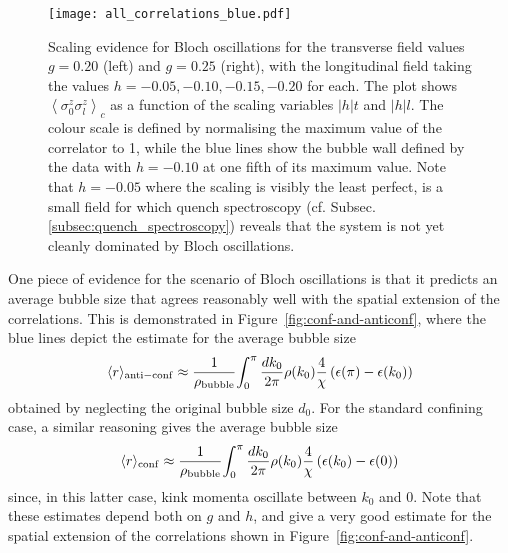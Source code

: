 \documentclass[amsmath,amssymb,11pt]{article}
\numberwithin{equation}{section}
\numberwithin{figure}{section}
\numberwithin{table}{section}
\begin{document}
\begin{figure}
\centering
\texttt{[image: all\_correlations\_blue.pdf]}
\caption{\label{fig:Scaling-evidence-for} Scaling evidence for Bloch oscillations
for the transverse field values $g=0.20$ (left) and $g=0.25$ (right),
with the longitudinal field taking the values $h=-0.05,-0.10,-0.15,-0.20$
for each. The plot shows $\left\langle \sigma_{0}^{z}\sigma_{l}^{z}\right\rangle _{c}$
as a function of the scaling variables $|h|t$ and $|h|l$. The colour scale is defined by normalising the maximum value of the correlator to 1, while the blue lines show the bubble wall defined by the data with $h=-0.10$ at one fifth of its maximum value. {Note that $h=-0.05$ where the scaling is visibly the least perfect, is a small field for which quench spectroscopy (cf. Subsec. \ref{subsec:quench_spectroscopy}) reveals that the system is not yet cleanly dominated by Bloch oscillations.}}
\end{figure}

One piece of evidence for the scenario of Bloch oscillations is that it predicts an average bubble size that agrees reasonably well with the spatial extension of the correlations. This is demonstrated in Figure~\ref{fig:conf-and-anticonf},
where the blue lines depict the estimate for the average bubble
size 
\begin{equation}
\langle{r}\rangle_{\rm anti-conf} \approx\frac{1}{\rho_\mathrm{bubble}}{\displaystyle\int_{0}^{\pi}\frac{dk_{0}}{2\pi}\rho(k_{0})\frac{{4}}{\chi}\left(\epsilon(\pi)-\epsilon(k_{0})\right)}
\label{eq:bsize_bloch}\end{equation}
obtained by neglecting the original bubble size $d_{0}$. For the standard confining case, a similar reasoning gives the average bubble size
\begin{equation}
\langle{r}\rangle_{\rm conf} \approx\frac{1}{\rho_\mathrm{bubble}}{\displaystyle \int_{0}^{\pi}\frac{dk_{0}}{2\pi}\rho(k_{0})\frac{4}{\chi}\left(\epsilon(k_{0})-\epsilon(0)\right)}
\label{eq:bsize_conf}
\end{equation}
since, in this latter case,  kink momenta oscillate between $k_0$ and $0$. Note that
these estimates depend both on $g$ and $h$, and 
give a very good estimate for the spatial extension of the correlations  shown in Figure~\ref{fig:conf-and-anticonf}.
\end{document}
